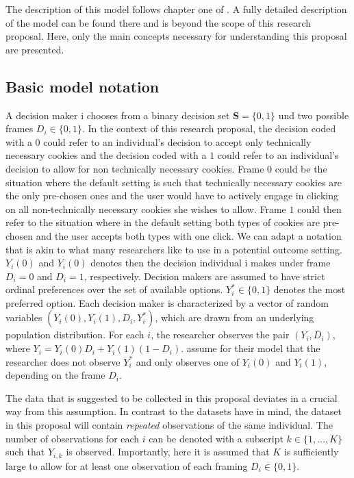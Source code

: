 The description of this model follows chapter one of \textcite{acquisti2015privacy}. A fully detailed description 
of the model can be found there and is beyond the scope of this research proposal. Here, only the main concepts 
necessary for understanding this proposal are presented.

\subsection{Basic model notation}

A decision maker i chooses from a binary decision set $ \textbf{S} = \lbrace 0,1 \rbrace  $ und two possible frames $ D_{i} \in \lbrace 0,1 \rbrace $. 
In the context of this research proposal, the decision coded with a $0$ 
could refer to an individual's decision to accept only technically necessary cookies and 
the decision coded with a $ 1 $ could refer to an individual's decision 
to allow for non technically necessary cookies. Frame $ 0 $ could be the situation where the default setting is such that 
technically necessary cookies are the only pre-chosen ones and the user would have to actively engage in clicking on all non-technically necessary 
cookies she wishes to allow. Frame $ 1 $ could then refer to the situation 
where in the default setting both types of cookies are pre-chosen and the user accepts both types with one click. We can adapt a notation that is akin to what many researchers like to use in a potential outcome setting. $ Y_{i}(0) $ and $ Y_{i}(0) $ denotes then the decision individual i makes under frame $ D_{i} = 0 $ and $ D_{i} = 1 $, respectively.
Decision makers are assumed to have strict ordinal preferences over the set of available options. $ Y^{*}_{i} \in \lbrace 0,1 \rbrace $ denotes the most preferred option.
Each decision maker is characterized by a vector of random variables 
$ (Y_i(0), Y_i(1), D_i, Y^*_i) $, which are drawn from an underlying population distribution.
For each $ i $, the researcher observes the pair $ (Y_i, D_i) $, where 
$ Y_i = Y_i(0)D_i + Y_i(1)(1-D_i)$. \textcite{goldin2020} assume for their model 
that the researcher does not observe $ Y^*_i $ and only observes one of $ Y_i(0)$ and $ Y_i(1)$, depending on the frame $D_i$.

The data that is suggested to be collected in this proposal deviates
in a crucial way from this assumption. In contrast to the datasets \textcite{goldin2020}
have in mind, the dataset in this proposal will contain \textit{repeated} observations of the same individual. 
The number of observations for each $ i $ can be denoted with a subscript 
$ k \in \lbrace 1,\dots, K \rbrace $ such that $ Y_{i, k} $ is observed. 
Importantly, here it is assumed that $ K $ is sufficiently large to allow for at 
least one observation of each framing $ D_{i} \in \lbrace 0,1 \rbrace $.

